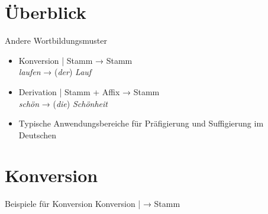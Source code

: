\section{Überblick}

\begin{frame}
  {Andere Wortbildungsmuster}
  \onslide<+->
  \begin{itemize}[<+->]
    \item \alert{Konversion} | Stamm → Stamm \\ 
      \textit{laufen} → (\textit{der}) \textit{Lauf}
      \Zeile
    \item \alert{Derivation} | Stamm + Affix → Stamm\\
      \textit{schön} → (\textit{die}) \textit{Schönheit}
      \Halbzeile
    \item Typische Anwendungsbereiche für \alert{Präfigierung} und \alert{Suffigierung} im Deutschen
  \end{itemize}
\end{frame}

\section{Konversion}

\begin{frame}
  {Beispiele für Konversion}
  \pause
  Konversion |  → \alert{Stamm}
  \Halbzeile
  \pause
  \begin{exe}
    \pause
    \pause
    \pause
    \pause
    \pause
    \pause
    \pause
  \end{exe}
\end{frame}

